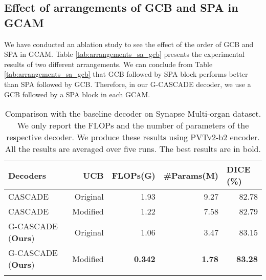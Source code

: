 \documentclass[10pt,twocolumn,letterpaper]{article}
\begin{document}
\subsection{Effect of arrangements of GCB and SPA in GCAM}
We have conducted an ablation study to see the effect of the order of GCB and SPA in GCAM. Table \ref{tab:arrangements_sa_gcb} presents the experimental results of two different arrangements. We can conclude from Table \ref{tab:arrangements_sa_gcb} that GCB followed by SPA block performs better than SPA followed by GCB. Therefore, in our G-CASCADE decoder, we use a GCB followed by a SPA block in each GCAM.
\begin{table}[t]
\centering 
    {\begin{adjustbox}{width=0.48\textwidth}
{\begin{tabular}{lrrrr}
\toprule
Decoders    & UCB &\multicolumn{1}{c}{FLOPs(G)} & \multicolumn{1}{c}{\#Params(M)} & \multicolumn{1}{l}{DICE (\%)} \\
\midrule
CASCADE         & Original & 1.93 & 9.27 & 82.78  \\
CASCADE       & Modified    & 1.22 & 7.58 & 82.79   \\
\midrule 
G-CASCADE (\textbf{Ours})       & Original & 1.06 & 3.47 & 83.15      \\
G-CASCADE (\textbf{Ours})     & Modified & \textbf{0.342} & \textbf{1.78}     & \textbf{83.28}   \\
\bottomrule \\
\end{tabular}}
\end{adjustbox}

}\caption{Comparison with the baseline decoder on Synapse Multi-organ dataset. We only report the FLOPs and the number of parameters of the respective decoder. We produce these results using PVTv2-b2 encoder. All the results are averaged over five runs. The best results are in bold.}
\label{tab:compare_baseline_decoder}
\end{table}
\end{document}
